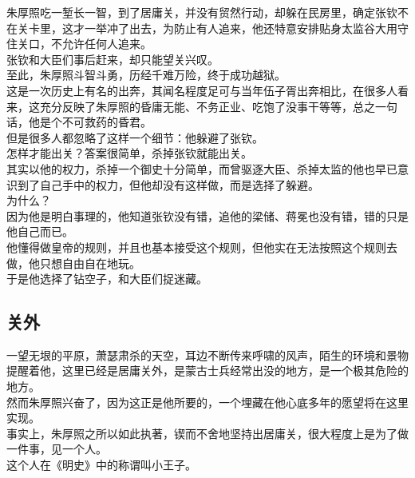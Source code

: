 \begin{multicols}{\theparacolNo}
朱厚照吃一堑长一智，到了居庸关，并没有贸然行动，却躲在民房里，确定张钦不在关卡里，这才一举冲了出去，为防止有人追来，他还特意安排贴身太监谷大用守住关口，不允许任何人追来。\\

张钦和大臣们事后赶来，却只能望关兴叹。\\

至此，朱厚照斗智斗勇，历经千难万险，终于成功越狱。\\

这是一次历史上有名的出奔，其闻名程度足可与当年伍子胥出奔相比，在很多人看来，这充分反映了朱厚照的昏庸无能、不务正业、吃饱了没事干等等，总之一句话，他是个不可救药的昏君。\\

但是很多人都忽略了这样一个细节：他躲避了张钦。\\

怎样才能出关？答案很简单，杀掉张钦就能出关。\\

其实以他的权力，杀掉一个御史十分简单，而曾驱逐大臣、杀掉太监的他也早已意识到了自己手中的权力，但他却没有这样做，而是选择了躲避。\\

为什么？\\

因为他是明白事理的，他知道张钦没有错，追他的梁储、蒋冕也没有错，错的只是他自己而已。\\

他懂得做皇帝的规则，并且也基本接受这个规则，但他实在无法按照这个规则去做，他只想自由自在地玩。\\

于是他选择了钻空子，和大臣们捉迷藏。\\

\subsection{关外}
一望无垠的平原，萧瑟肃杀的天空，耳边不断传来呼啸的风声，陌生的环境和景物提醒着他，这里已经是居庸关外，是蒙古士兵经常出没的地方，是一个极其危险的地方。\\

然而朱厚照兴奋了，因为这正是他所要的，一个埋藏在他心底多年的愿望将在这里实现。\\

事实上，朱厚照之所以如此执著，锲而不舍地坚持出居庸关，很大程度上是为了做一件事，见一个人。\\

这个人在《明史》中的称谓叫小王子。\\
\ifnum{}
	\end{multicols}
\fi
\newpage
